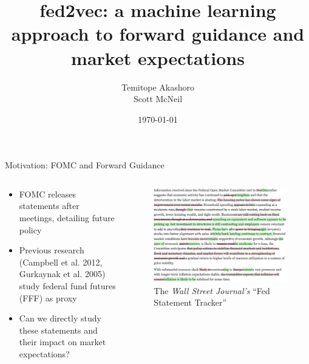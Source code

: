 \documentclass[9pt]{beamer}
\title{fed2vec: a machine learning approach to forward guidance and market expectations}
\author{Temitope Akashoro\\
	Scott McNeil}
\date{\today}
\begin{document}
	
	\begin{frame}
		\titlepage
	\end{frame}
	
	
	\begin{frame}{Motivation: FOMC and Forward Guidance}
		
		\begin{columns}
			\begin{column}{0.5\textwidth}
				\begin{itemize}
					\item FOMC releases statements after meetings, detailing future policy
					\item Previous research (Campbell et al. 2012, Gurkaynak et al. 2005) study federal fund futures (FFF) as proxy
					\item Can we directly study these statements and their impact on market expectations?
				\end{itemize}
			\end{column}
			\begin{column}{0.5\textwidth}
				\begin{figure}
					\includegraphics[width=1.05\textwidth]{fomcstatement.png}
					\caption{The \emph{Wall Street Journal's} \textquotedblleft Fed Statement Tracker\textquotedblright}
				\end{figure}
			\end{column}
		\end{columns}
		
	\end{frame}
	
\end{document}

